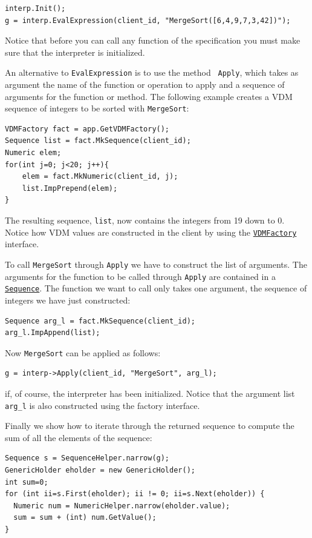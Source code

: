 \documentclass[\pformat,12pt]{article}
\newcommand{\VDMFactory}{\hyperlink{interface.VDMFactory}{VDMFactory}}
\newcommand{\Sequence}{\hyperlink{interface.VDMSequence}{Sequence}}
\begin{document}
\begin{verbatim}
interp.Init();
g = interp.EvalExpression(client_id, "MergeSort([6,4,9,7,3,42])");
\end{verbatim}

Notice that before you can call any function of the specification you
must make sure that the interpreter is initialized.  

An alternative to {\tt EvalExpression} is to use the method {\tt
  Apply}, which takes as argument the name of the function or
operation to apply and a sequence of arguments for the function or
method. The following example creates a VDM sequence of integers to be
sorted with {\tt MergeSort}:

\begin{verbatim}
VDMFactory fact = app.GetVDMFactory();
Sequence list = fact.MkSequence(client_id);
Numeric elem;
for(int j=0; j<20; j++){
    elem = fact.MkNumeric(client_id, j);
    list.ImpPrepend(elem);
}
\end{verbatim}                

The resulting sequence, {\tt list}, now contains the integers from 19
down to 0. Notice how VDM values are constructed in the client by
using the {\tt \VDMFactory} interface.  

To call {\tt MergeSort} through {\tt Apply} we
have to construct the list of arguments. The arguments for the
function to be called through {\tt Apply} are contained in a {\tt \Sequence}.
The function we want to call only takes one argument, the sequence of
integers we have just constructed:

\begin{verbatim}
Sequence arg_l = fact.MkSequence(client_id);
arg_l.ImpAppend(list);
\end{verbatim}

Now \texttt{MergeSort} can be applied as follows:

\begin{verbatim}
g = interp->Apply(client_id, "MergeSort", arg_l);
\end{verbatim}

if, of course, the interpreter has been initialized. Notice that the
argument list {\tt arg\_l} is also constructed using the factory
interface.  

                
Finally we show how to iterate through the returned sequence to compute the
sum of all the elements of the sequence:

\begin{verbatim}
Sequence s = SequenceHelper.narrow(g);
GenericHolder eholder = new GenericHolder();
int sum=0;
for (int ii=s.First(eholder); ii != 0; ii=s.Next(eholder)) {
  Numeric num = NumericHelper.narrow(eholder.value);
  sum = sum + (int) num.GetValue();
}
\end{verbatim}
\end{document}
